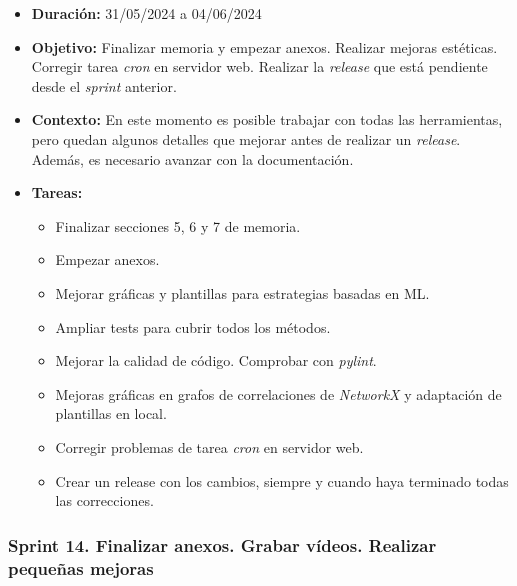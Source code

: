 
\begin{itemize}
\item  
\textbf{Duración:} 31/05/2024 a 04/06/2024

\item
\textbf{Objetivo:} Finalizar memoria y empezar anexos. Realizar mejoras estéticas. Corregir tarea \emph{cron} en servidor web. Realizar la \emph{release} que está pendiente desde el \emph{sprint} anterior.


\item
\textbf{Contexto:} En este momento es posible trabajar con todas las herramientas, pero quedan algunos detalles que mejorar antes de realizar un \emph{release}. Además, es necesario avanzar con la documentación.


\item
\textbf{Tareas:}
	\begin{itemize}
	\tightlist
	\item 
	Finalizar secciones 5, 6 y 7 de memoria.
	\item
	Empezar anexos. 
	\item
	Mejorar gráficas y plantillas para estrategias basadas en ML. 
	\item
	Ampliar tests para cubrir todos los métodos. 
	\item
	Mejorar la calidad de código. Comprobar con \emph{pylint}.  
	\item
	Mejoras gráficas en grafos de correlaciones de \emph{NetworkX} y adaptación de plantillas en local.
	\item
	Corregir problemas de tarea \emph{cron} en servidor web. 
	\item
	Crear un release con los cambios, siempre y cuando haya terminado todas las correcciones.
  	\end{itemize}
\end{itemize}

\subsubsection{Sprint 14. Finalizar anexos. Grabar vídeos. Realizar pequeñas mejoras}


